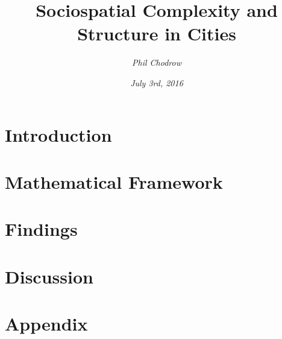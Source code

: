 \documentclass[english]{scrartcl}
\title{Sociospatial Complexity and Structure in Cities}
\author{\emph{Phil Chodrow}}
\date{\emph{July 3rd, 2016}}
\begin{document}

\maketitle

	
\section{Introduction}
	
\section{Mathematical Framework}
	
\section{Findings}
	
\section{Discussion}
	

{}

	
\section{Appendix}
		
\end{document}
